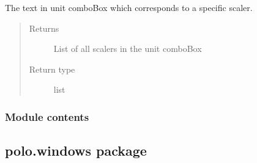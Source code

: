 \documentclass[letterpaper,10pt,english]{sphinxmanual}
\begin{document}
\begin{fulllineitems}
\begin{fulllineitems}
\end{fulllineitems}


\begin{fulllineitems}
\label{\detokenize{polo.widgets:polo.widgets.unit_combo.UnitComboBox.unit_combobox_text}}
The text in unit comboBox which corresponds to a specific scaler.
\begin{quote}\begin{description}
\item[{Returns}] \leavevmode
List of all scalers in the unit comboBox

\item[{Return type}] \leavevmode
list

\end{description}\end{quote}

\end{fulllineitems}


\begin{fulllineitems}
\label{\detokenize{polo.widgets:polo.widgets.unit_combo.UnitComboBox.unit_text_parser}}
\end{fulllineitems}


\end{fulllineitems}



\subsubsection{Module contents}
\label{\detokenize{polo.widgets:module-polo.widgets}}\label{\detokenize{polo.widgets:module-contents}}

\subsection{polo.windows package}
\label{\detokenize{polo.windows:polo-windows-package}}\label{\detokenize{polo.windows::doc}}
\end{document}
